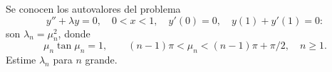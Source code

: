 Se conocen los autovalores del problema
\[y''+\lambda y=0,\quad0<x<1,\quad y'(0)=0,\quad y(1)+y'(1)=0:\]
son $\lambda_n=\mu_n^2$, donde
\[\mu_n\tan\mu_n=1,\qquad(n-1)\pi<\mu_n<(n-1)\pi+\pi/2,\quad n\ge1.\]
Estime $\lambda_n$ para $n$ grande.
